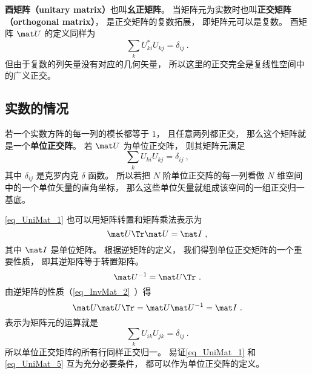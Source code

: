 
\begin{issues}
\issueDraft
{}
\end{issues}

\textbf{酉矩阵（unitary matrix）}也叫\textbf{幺正矩阵}。 当矩阵元为实数时也叫\textbf{正交矩阵（orthogonal matrix）}， 是正交矩阵的复数拓展， 即矩阵元可以是复数。 酉矩阵 $\mat U$ 的定义同样为
\begin{equation}
\sum_k U_{ki}^* U_{kj} = \delta_{ij}~.
\end{equation}
但由于复数的列矢量没有对应的几何矢量， 所以这里的正交完全是复线性空间中的广义正交。

\subsection{实数的情况}


若一个实数方阵的每一列的模长都等于 $1$， 且任意两列都正交， 那么这个矩阵就是一个\textbf{单位正交阵}。 若 $\mat U$ 为单位正交阵， 则其矩阵元满足
\begin{equation}\label{eq_UniMat_1}
\sum_k U_{ki} U_{kj} = \delta_{ij}~,
\end{equation}
其中 $\delta_{ij}$ 是克罗内克 $\delta$ 函数。 所以若把 $N$ 阶单位正交阵的每一列看做 $N$ 维空间中的一个单位矢量的直角坐标， 那么这些单位矢量就组成该空间的一组正交归一基底。

\autoref{eq_UniMat_1} 也可以用矩阵转置和矩阵乘法表示为
\begin{equation}
\mat U\Tr \mat U = \mat I~,
\end{equation}
其中 $\mat I$ 是单位矩阵。 根据逆矩阵的定义， 我们得到单位正交矩阵的一个重要性质， 即其逆矩阵等于转置矩阵。
\begin{equation}\label{eq_UniMat_2}
\mat U^{-1} = \mat U\Tr~.
\end{equation}
由逆矩阵的性质（\autoref{eq_InvMat_2}~）得
\begin{equation}
\mat U \mat U\Tr = \mat U \mat U^{-1} = \mat I~.
\end{equation}
表示为矩阵元的运算就是
\begin{equation}\label{eq_UniMat_5}
\sum_k U_{ik} U_{jk} = \delta_{ij}~.
\end{equation}
所以单位正交矩阵的所有行同样正交归一。 易证\autoref{eq_UniMat_1} 和\autoref{eq_UniMat_5} 互为充分必要条件， 都可以作为单位正交阵的定义。

